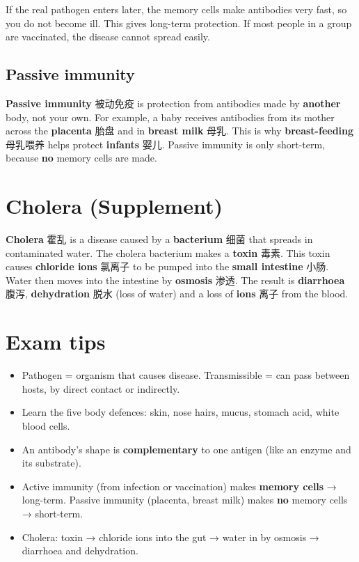 \documentclass[11pt]{article}
\begin{document}
If the real pathogen enters later, the memory cells make antibodies very fast, so you do not become ill. This gives long-term protection. If most people in a group are vaccinated, the disease cannot spread easily.

\subsection*{Passive immunity}

\textbf{Passive immunity} 被动免疫 is protection from antibodies made by \textbf{another} body, not your own. For example, a baby receives antibodies from its mother across the \textbf{placenta} 胎盘 and in \textbf{breast milk} 母乳. This is why \textbf{breast-feeding} 母乳喂养 helps protect \textbf{infants} 婴儿. Passive immunity is only short-term, because \textbf{no} memory cells are made.

\section*{Cholera (Supplement)}

\textbf{Cholera} 霍乱 is a disease caused by a \textbf{bacterium} 细菌 that spreads in contaminated water. The cholera bacterium makes a \textbf{toxin} 毒素. This toxin causes \textbf{chloride ions} 氯离子 to be pumped into the \textbf{small intestine} 小肠. Water then moves into the intestine by \textbf{osmosis} 渗透. The result is \textbf{diarrhoea} 腹泻, \textbf{dehydration} 脱水 (loss of water) and a loss of \textbf{ions} 离子 from the blood.

\section*{Exam tips}

\begin{itemize}
\item Pathogen = organism that causes disease. Transmissible = can pass between hosts, by direct contact or indirectly.

\item Learn the five body defences: skin, nose hairs, mucus, stomach acid, white blood cells.

\item An antibody's shape is \textbf{complementary} to one antigen (like an enzyme and its substrate).

\item Active immunity (from infection or vaccination) makes \textbf{memory cells} → long-term. Passive immunity (placenta, breast milk) makes \textbf{no} memory cells → short-term.

\item Cholera: toxin → chloride ions into the gut → water in by osmosis → diarrhoea and dehydration.

\end{itemize}
\end{document}
